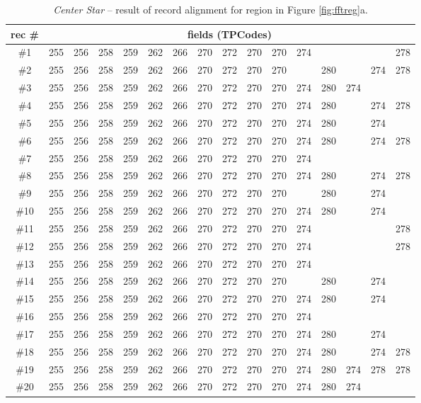 \documentclass{vldb}
\begin{document}
\begin{table}[h]
\centering
\caption{\textit{Center Star} -- result of record alignment for region in Figure
\ref{fig:fftreg}a.}
\label{table:align}
\begin{tiny}
\setlength\tabcolsep{2.3pt}
\begin{tabular}
{|c|l|l|l|l|l|l|l|l|l|l|l|l|l|l|l|} \hline
rec \#&\multicolumn{15}{c|}{fields (TPCodes)}\\ \hline
 \#1&255&256&258&259&262&266&270&272&270&270&274&   &   &   &278\\ \hline
 \#2&255&256&258&259&262&266&270&272&270&270&   &280&   &274&278\\ \hline
 \#3&255&256&258&259&262&266&270&272&270&270&274&280&274&   &   \\ \hline
 \#4&255&256&258&259&262&266&270&272&270&270&274&280&   &274&278\\ \hline
 \#5&255&256&258&259&262&266&270&272&270&270&274&280&   &274&   \\ \hline
 \#6&255&256&258&259&262&266&270&272&270&270&274&280&   &274&278\\ \hline
 \#7&255&256&258&259&262&266&270&272&270&270&274&   &   &   &   \\ \hline
 \#8&255&256&258&259&262&266&270&272&270&270&274&280&   &274&278\\ \hline
 \#9&255&256&258&259&262&266&270&272&270&270&   &280&   &274&   \\ \hline
\#10&255&256&258&259&262&266&270&272&270&270&274&280&   &274&   \\ \hline
\#11&255&256&258&259&262&266&270&272&270&270&274&   &   &   &278\\ \hline
\#12&255&256&258&259&262&266&270&272&270&270&274&   &   &   &278\\ \hline
\#13&255&256&258&259&262&266&270&272&270&270&274&   &   &   &   \\ \hline
\#14&255&256&258&259&262&266&270&272&270&270&   &280&   &274&   \\ \hline
\#15&255&256&258&259&262&266&270&272&270&270&274&280&   &274&   \\ \hline
\#16&255&256&258&259&262&266&270&272&270&270&274&   &   &   &   \\ \hline
\#17&255&256&258&259&262&266&270&272&270&270&274&280&   &274&   \\ \hline
\#18&255&256&258&259&262&266&270&272&270&270&274&280&   &274&278\\ \hline
\#19&255&256&258&259&262&266&270&272&270&270&274&280&274&278&278\\ \hline
\#20&255&256&258&259&262&266&270&272&270&270&274&280&274&   &   \\ \hline
\end{tabular}
\end{tiny}%
\end{table}
\end{document}
